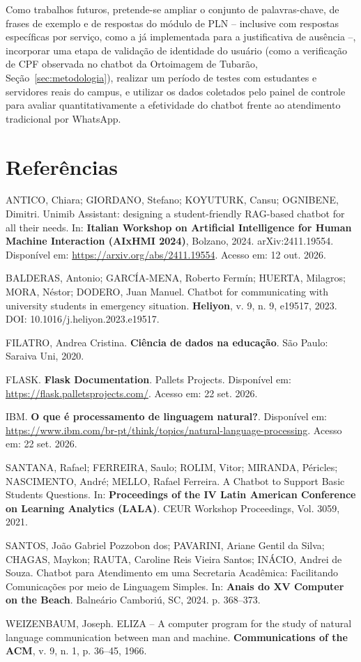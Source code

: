 \documentclass[12pt]{article}
\begin{document}
Como trabalhos futuros, pretende-se ampliar o conjunto de palavras-chave, de frases de exemplo e de respostas do módulo de PLN -- inclusive com respostas específicas por serviço, como a já implementada para a justificativa de ausência --, incorporar uma etapa de validação de
identidade do usuário (como a verificação de CPF observada no chatbot da
Ortoimagem de Tubarão, Seção~\ref{sec:metodologia}), realizar um período de testes com
estudantes e servidores reais do campus, e utilizar os dados coletados
pelo painel de controle para avaliar quantitativamente a efetividade do
chatbot frente ao atendimento tradicional por WhatsApp.

\section{Referências}

ANTICO, Chiara; GIORDANO, Stefano; KOYUTURK, Cansu; OGNIBENE, Dimitri.
Unimib Assistant: designing a student-friendly RAG-based chatbot for all
their needs. In: \textbf{Italian Workshop on Artificial Intelligence for
Human Machine Interaction (AIxHMI 2024)}, Bolzano, 2024. arXiv:2411.19554.
Disponível em: \url{https://arxiv.org/abs/2411.19554}. Acesso em: 12 out.
2026.

BALDERAS, Antonio; GARCÍA-MENA, Roberto Fermín; HUERTA, Milagros; MORA,
Néstor; DODERO, Juan Manuel. Chatbot for communicating with university
students in emergency situation. \textbf{Heliyon}, v. 9, n. 9, e19517,
2023. DOI: 10.1016/j.heliyon.2023.e19517.

FILATRO, Andrea Cristina. \textbf{Ciência de dados na educação}. São
Paulo: Saraiva Uni, 2020.

FLASK. \textbf{Flask Documentation}. Pallets Projects. Disponível em:
\url{https://flask.palletsprojects.com/}. Acesso em: 22 set. 2026.

IBM. \textbf{O que é processamento de linguagem natural?}. Disponível em:
\url{https://www.ibm.com/br-pt/think/topics/natural-language-processing}.
Acesso em: 22 set. 2026.

SANTANA, Rafael; FERREIRA, Saulo; ROLIM, Vitor; MIRANDA, Péricles;
NASCIMENTO, André; MELLO, Rafael Ferreira. A Chatbot to Support Basic
Students Questions. In: \textbf{Proceedings of the IV Latin American
Conference on Learning Analytics (LALA)}. CEUR Workshop Proceedings, Vol.
3059, 2021.

SANTOS, João Gabriel Pozzobon dos; PAVARINI, Ariane Gentil da Silva;
CHAGAS, Maykon; RAUTA, Caroline Reis Vieira Santos; INÁCIO, Andrei de
Souza. Chatbot para Atendimento em uma Secretaria Acadêmica: Facilitando
Comunicações por meio de Linguagem Simples. In: \textbf{Anais do XV
Computer on the Beach}. Balneário Camboriú, SC, 2024. p. 368--373.

WEIZENBAUM, Joseph. ELIZA -- A computer program for the study of natural
language communication between man and machine. \textbf{Communications of
the ACM}, v. 9, n. 1, p. 36--45, 1966.
\end{document}
